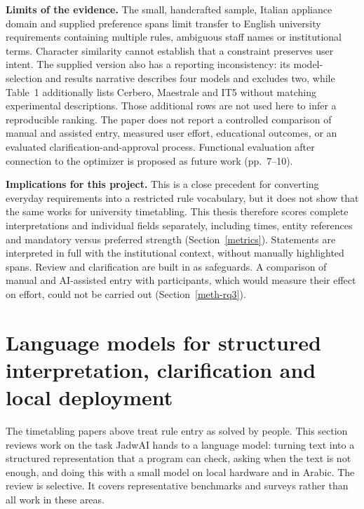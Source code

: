 \textbf{Limits of the evidence.} The small, handcrafted sample, Italian appliance domain and supplied preference spans limit transfer to English university requirements containing multiple rules, ambiguous staff names or institutional terms. Character similarity cannot establish that a constraint preserves user intent. The supplied version also has a reporting inconsistency: its model-selection and results narrative describes four models and excludes two, while Table~1 additionally lists Cerbero, Maestrale and IT5 without matching experimental descriptions. Those additional rows are not used here to infer a reproducible ranking. The paper does not report a controlled comparison of manual and assisted entry, measured user effort, educational outcomes, or an evaluated clarification-and-approval process. Functional evaluation after connection to the optimizer is proposed as future work (pp.~7--10).

\textbf{Implications for this project.} This is a close precedent for converting everyday requirements into a restricted rule vocabulary, but it does not show that the same works for university timetabling. This thesis therefore scores complete interpretations and individual fields separately, including times, entity references and mandatory versus preferred strength (Section~\ref{metrics}). Statements are interpreted in full with the institutional context, without manually highlighted spans. Review and clarification are built in as safeguards. A comparison of manual and AI-assisted entry with participants, which would measure their effect on effort, could not be carried out (Section~\ref{meth-rq3}).

\section[Language models for structured interpretation]{Language models for structured interpretation, clarification and local deployment}\label{rw-llm}

The timetabling papers above treat rule entry as solved by people. This section reviews work on the task JadwAI hands to a language model: turning text into a structured representation that a program can check, asking when the text is not enough, and doing this with a small model on local hardware and in Arabic. The review is selective. It covers representative benchmarks and surveys rather than all work in these areas.

